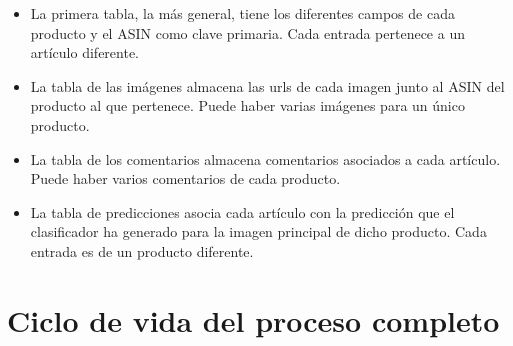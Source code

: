 \begin{itemize}
    \item La primera tabla, la más general, tiene los diferentes campos de cada producto y el ASIN como clave primaria. Cada entrada pertenece a un artículo diferente.
    \item La tabla de las imágenes almacena las urls de cada imagen junto al ASIN del producto al que pertenece. Puede haber varias imágenes para un único producto.
    \item La tabla de los comentarios almacena comentarios asociados a cada artículo. Puede haber varios comentarios de cada producto.
    \item La tabla de predicciones asocia cada artículo con la predicción que el clasificador ha generado para la imagen principal de dicho producto. Cada entrada es de un producto diferente.
\end{itemize}


\section{Ciclo de vida del proceso completo}
